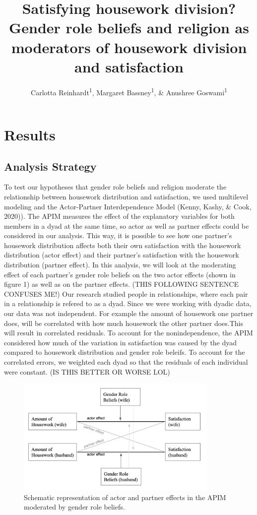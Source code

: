 \documentclass[
  man,floatsintext]{apa6}
\title{Satisfying housework division? Gender role beliefs and religion as moderators of housework division and satisfaction}
\author{Carlotta Reinhardt\textsuperscript{1}, Margaret Bassney\textsuperscript{1}, \& Anushree Goswami\textsuperscript{1}}
\date{}
\affiliation{\vspace{0.5cm}\textsuperscript{1} Smith College}
\begin{document}
\maketitle

\hypertarget{results}{%
\section{Results}\label{results}}

\hypertarget{analysis-strategy}{%
\subsection{Analysis Strategy}\label{analysis-strategy}}

To test our hypotheses that gender role beliefs and religion moderate the relationship between housework distribution and satisfaction, we used multilevel modeling and the Actor-Partner Interdependence Model (Kenny, Kashy, \& Cook, 2020)). The APIM measures the effect of the explanatory variables for both members in a dyad at the same time, so actor as well as partner effects could be considered in our analysis. This way, it is possible to see how one partner's housework distribution affects both their own satisfaction with the housework distribution (actor effect) and their partner's satisfaction with the housework distribution (partner effect). In this analysis, we will look at the moderating effect of each partner's gender role beliefs on the two actor effects (shown in figure 1) as well as on the partner effects. (THIS FOLLOWING SENTENCE CONFUSES ME!) Our research studied people in relationships, where each pair in a relationship is refered to as a dyad. Since we were working with dyadic data, our data was not independent. For example the amount of housework one partner does, will be correlated with how much housework the other partner does.This will result in correlated residuals. To account for the nonindependence, the APIM considered how much of the variation in satisfaction was caused by the dyad compared to housework distribution and gender role beleifs. To account for the correlated errors, we weighted each dyad so that the residuals of each individual were constant. (IS THIS BETTER OR WORSE LOL)



\begin{figure}
\includegraphics[width=3.83in]{APIM} \caption{Schematic representation of actor and partner effects in the APIM moderated by gender role beliefs.}\label{fig:unnamed-chunk-3}
\end{figure}
\end{document}

